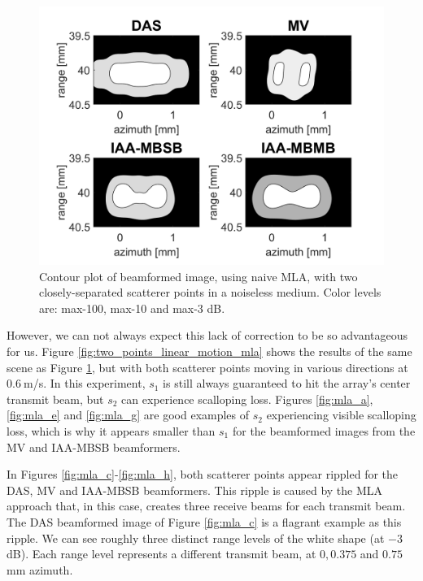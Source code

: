 \begin{figure}[ht]
    \centering
    \includegraphics[width=\linewidth]{./images/results/4/two_points_static_mla.png}
	\caption[Contour plot of beamformed image, using naive MLA, with two closely-separated scatterer points in a noiseless medium]{Contour plot of beamformed image, using naive MLA, with two closely-separated scatterer points in a noiseless medium. Color levels are:  max-100, max-10 and max-3 dB.}
	\label{fig:two_points_static_mla}
\end{figure}

However, we can not always expect this lack of correction to be so advantageous for us.
Figure \ref{fig:two_points_linear_motion_mla} shows the results of the same scene as Figure \ref{fig:two_points_static_mla}, but with both scatterer points moving in various directions at $0.6~$m/s.
In this experiment, $s_1$ is still always guaranteed to hit the array's center transmit beam, but $s_2$ can experience scalloping loss.
Figures \ref{fig:mla_a}, \ref{fig:mla_e} and \ref{fig:mla_g} are good examples of $s_2$ experiencing visible scalloping loss, which is why it appears smaller than $s_1$ for the beamformed images from the MV and IAA-MBSB beamformers.

In Figures \ref{fig:mla_c}-\ref{fig:mla_h}, both scatterer points appear rippled for the DAS, MV and IAA-MBSB beamformers. This ripple is caused by the MLA approach that, in this case, creates three receive beams for each transmit beam.
The DAS beamformed image of Figure \ref{fig:mla_c} is a flagrant example as this ripple. We can see roughly three distinct range levels of the white shape (at $-3~$dB). Each range level represents a different transmit beam, at $0, 0.375$ and $0.75~$mm azimuth.

